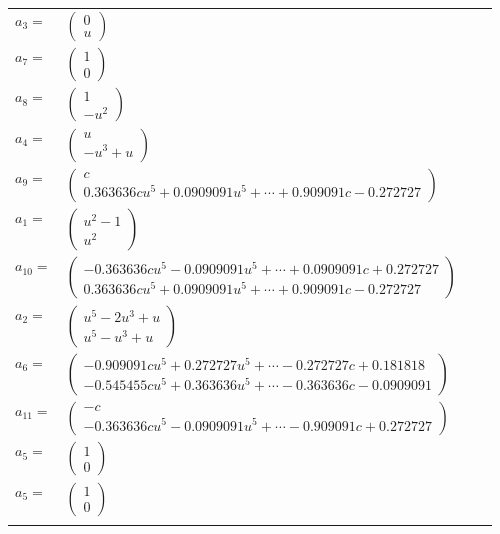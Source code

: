 \documentclass[1p]{elsarticle_modified}
\theoremstyle{definition}
\begin{document}
\begin{tabular}{m{7pt} m{180pt} m{7pt} m{180pt} }
\flushright $a_{3}=$&$\begin{pmatrix}0\\u\end{pmatrix}$ \\
\flushright $a_{7}=$&$\begin{pmatrix}1\\0\end{pmatrix}$ \\
\flushright $a_{8}=$&$\begin{pmatrix}1\\- u^2\end{pmatrix}$ \\
\flushright $a_{4}=$&$\begin{pmatrix}u\\- u^3+u\end{pmatrix}$ \\
\flushright $a_{9}=$&$\begin{pmatrix}c\\0.363636 c u^{5}+0.0909091 u^{5}+\cdots+0.909091 c-0.272727\end{pmatrix}$ \\
\flushright $a_{1}=$&$\begin{pmatrix}u^2-1\\u^2\end{pmatrix}$ \\
\flushright $a_{10}=$&$\begin{pmatrix}-0.363636 c u^{5}-0.0909091 u^{5}+\cdots+0.0909091 c+0.272727\\0.363636 c u^{5}+0.0909091 u^{5}+\cdots+0.909091 c-0.272727\end{pmatrix}$ \\
\flushright $a_{2}=$&$\begin{pmatrix}u^5-2 u^3+u\\u^5- u^3+u\end{pmatrix}$ \\
\flushright $a_{6}=$&$\begin{pmatrix}-0.909091 c u^{5}+0.272727 u^{5}+\cdots-0.272727 c+0.181818\\-0.545455 c u^{5}+0.363636 u^{5}+\cdots-0.363636 c-0.0909091\end{pmatrix}$ \\
\flushright $a_{11}=$&$\begin{pmatrix}- c\\-0.363636 c u^{5}-0.0909091 u^{5}+\cdots-0.909091 c+0.272727\end{pmatrix}$ \\
\flushright $a_{5}=$&$\begin{pmatrix}1\\0\end{pmatrix}$\\ \flushright $a_{5}=$&$\begin{pmatrix}1\\0\end{pmatrix}$\\&\end{tabular}
\end{document}
